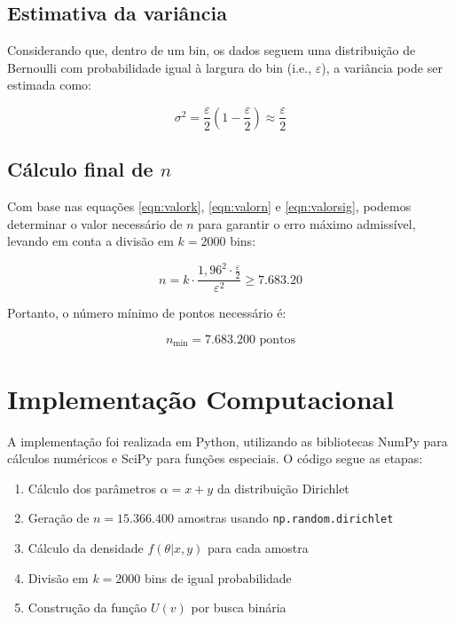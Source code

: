 \documentclass[12pt, a4paper]{article}
\begin{document}
\subsection{Estimativa da variância}

Considerando que, dentro de um bin, os dados seguem uma distribuição de Bernoulli com probabilidade igual à largura do bin (i.e., \( \varepsilon \)), a variância pode ser estimada como:

\begin{equation}
    \sigma^2 = \frac{\varepsilon}{2} \left(1 - \frac{\varepsilon}{2} \right) \approx \frac{\varepsilon}{2}
    \label{eqn:valorsig}
\end{equation}

\subsection{Cálculo final de \( n \)}

Com base nas equações \ref{eqn:valork}, \ref{eqn:valorn} e \ref{eqn:valorsig}, podemos determinar o valor necessário de \( n \) para garantir o erro máximo admissível, levando em conta a divisão em \( k = 2000 \) bins:

\begin{equation*}
    n = k \cdot \frac{1{,}96^2 \cdot \frac{\varepsilon}{2}}{\varepsilon^2} \geq 7.683.20
\end{equation*}

Portanto, o número mínimo de pontos necessário é:

\[
n_{\text{min}} = 7.683.200 \text{ pontos}
\]


\section{Implementação Computacional}

A implementação foi realizada em Python, utilizando as bibliotecas NumPy para cálculos numéricos e SciPy para funções especiais. O código segue as etapas:

\begin{enumerate}
    \item Cálculo dos parâmetros $\alpha = x + y$ da distribuição Dirichlet
    \item Geração de $n = 15.366.400$ amostras usando \texttt{np.random.dirichlet}
    \item Cálculo da densidade $f(\theta|x,y)$ para cada amostra
    \item Divisão em $k = 2000$ bins de igual probabilidade
    \item Construção da função $U(v)$ por busca binária
\end{enumerate}
\end{document}
